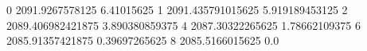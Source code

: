 0 2091.9267578125 6.41015625
1 2091.435791015625 5.919189453125
2 2089.406982421875 3.890380859375
4 2087.30322265625 1.78662109375
6 2085.91357421875 0.39697265625
8 2085.5166015625 0.0
